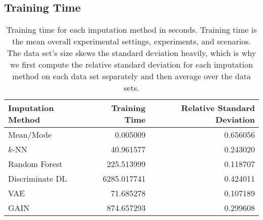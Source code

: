 \subsection{Training Time}

\begin{table}
	\centering
	\begin{tabular}{lrr}
		\toprule
		Imputation Method &  Training Time &  Relative Standard Deviation \\
		\midrule
		Mean/Mode &       0.005009 &                     0.656056 \\
		$k$-NN &      40.961577 &                     0.243020 \\
		Random Forest &     225.513999 &                     0.118707 \\
		Discriminate DL &    6285.017741 &                     0.424011 \\
		VAE &      71.685278 &                     0.107189 \\
		GAIN &     874.657293 &                     0.299608 \\
		\bottomrule
	\end{tabular}
	\caption{Training time for each imputation method in seconds. Training time is the mean overall experimental settings, experiments, and scenarios. The data set's size skews the standard deviation heavily, which is why we first compute the relative standard deviation for each imputation method on each data set separately and then average over the data sets.}
	\label{tab:training_time}
\end{table}
